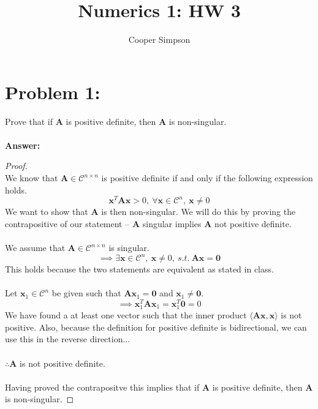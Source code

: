 \documentclass[]{article}
\title{Numerics 1: HW 3}
\author{Cooper Simpson}
\begin{document}
\maketitle

\section*{Problem 1:}
Prove that if $\mathbf{A}$ is positive definite, then $\mathbf{A}$ is non-singular.
\\~\\
\textbf{Answer:}
\begin{proof}~\\
	We know that $\mathbf{A}\in\mathcal{C}^{n\times n}$ is positive definite if and only if the following expression holds.
	\[\mathbf{x}^T\mathbf{A}\mathbf{x}>0,\:\forall\mathbf{x}\in\mathcal{C}^n,\:\mathbf{x}\neq0\]
	We want to show that $\mathbf{A}$ is then non-singular. We will do this by proving the contrapositive of our statement -- $\mathbf{A}$ singular implies $\mathbf{A}$ not positive definite.\\~\\
	We assume that $\mathbf{A}\in\mathcal{C}^{n\times n}$ is singular.
	\[\implies \exists \mathbf{x}\in\mathcal{C}^n,\: \mathbf{x}\neq0,\: s.t.\:\mathbf{Ax}=\mathbf{0}\]
	This holds because the two statements are equivalent as stated in class.\\~\\
	Let $\mathbf{x}_1\in\mathcal{C}^n$ be given such that $\mathbf{Ax}_1=\mathbf{0}$ and $\mathbf{x}_1\neq\mathbf{0}$.
	\[\implies\mathbf{x}_1^T\mathbf{Ax}_1=\mathbf{x}_1^T\mathbf{0}=0\]
	We have found a at least one vector such that the inner product $\langle\mathbf{Ax},\mathbf{x}\rangle$ is not positive. Also, because the definition for positive definite is bidirectional, we can use this in the reverse direction...\\~\\
	$\therefore \mathbf{A}$ is not positive definite.\\~\\
	Having proved the contrapositve this implies that if $\mathbf{A}$ is positive definite, then $\mathbf{A}$ is non-singular.
\end{proof}

\newpage
\end{document}
